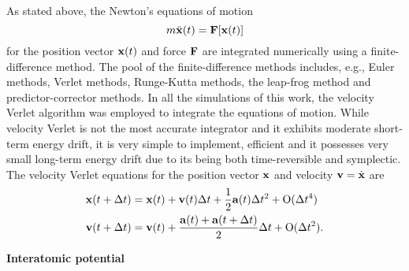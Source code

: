 
As stated above, the Newton's equations of motion 
\begin{equation}
 m \ddot{\mathbf{x}}(t) = \mathbf{F}[\mathbf{x}(t)]
\end{equation}
for the position vector $\mathbf{x}(t)$ and force $\mathbf{F}$ are integrated numerically using a finite-difference method. The pool of the finite-difference methods includes, e.g., Euler methods, Verlet methods, Runge-Kutta methods, the leap-frog method and predictor-corrector methods. In all the simulations of this work, the velocity Verlet algorithm was employed to integrate the equations of motion. While velocity Verlet is not the most accurate integrator and it exhibits moderate short-term energy drift, it is very simple to implement, efficient and it possesses very small long-term energy drift due to its being both time-reversible and symplectic. The velocity Verlet equations for the position vector $\mathbf{x}$ and velocity $\mathbf{v}=\dot{\mathbf{x}}$ are
\begin{alignat}{2}
  \mathbf{x}(t+\Delta t) &= \mathbf{x}(t) + \mathbf{v}(t)\Delta t+  \frac{1}{2}\mathbf{a}(t) \Delta t^2 + \mathrm{O}(\Delta t^4) \\
  \mathbf{v}(t+\Delta t) &= \mathbf{v}(t) + \frac{ \mathbf{a}(t)+\mathbf{a}(t+\Delta t)}{2} \Delta t+ \mathrm{O}(\Delta t^2) .
\end{alignat}

%
 

\textbf{Interatomic potential}

